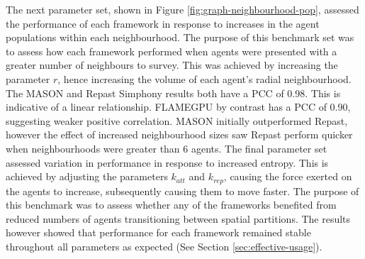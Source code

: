   The next parameter set, shown in Figure \ref{fig:graph-neighbourhood-pop}, assessed the performance of each framework in response to increases in the agent populations within each neighbourhood. The purpose of this benchmark set was to assess how each framework performed when agents were presented with a greater number of neighbours to survey. This was achieved by increasing the parameter $r$, hence increasing the volume of each agent's radial neighbourhood. The MASON and Repast Simphony results both have a PCC \cite{PCC} of 0.98. This is indicative of a linear relationship. FLAMEGPU by contrast has a PCC of 0.90, suggesting weaker positive correlation. MASON initially outperformed Repast, however the effect of increased neighbourhood sizes saw Repast perform quicker when neighbourhoods were greater than 6 agents.
  The final parameter set assessed variation in performance in response to increased entropy. This is achieved by adjusting the parameters $k_{att}$ and $k_{rep}$, causing the force exerted on the agents to increase, subsequently causing them to move faster.
  The purpose of this benchmark was to assess whether any of the frameworks benefited from reduced numbers of agents transitioning between spatial partitions. The results however showed that performance for each framework remained stable throughout all parameters as expected (See Section \ref{sec:effective-usage}).
